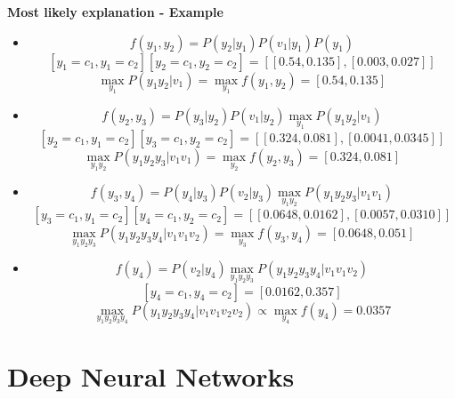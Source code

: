 \documentclass[parskip=half]{scrartcl}
\begin{document}
        \textbf{Most likely explanation - Example}
        \begin{itemize}
            \item 
            $$f(y_1, y_2) = P(y_2|y_1) P(v_1|y_1) P(y_1)$$
            $$[y_1 = c_1, y_1 = c_2] [y_2 = c_1, y_2 = c_2] = [[0.54, 0.135], [0.003, 0.027]] $$
            $$\max_{y_1} P(y_1y_2|v_1) = \max_{y_1} f(y_1, y_2) = [0.54, 0.135] $$
            \item 
            $$f(y_2, y_3) = P(y_3|y_2) P(v_1|y_2) \max_{y_1} P(y_1y_2|v_1)$$
            $$[y_2 = c_1, y_1 = c_2] [y_3 = c_1, y_2 = c_2] = [[0.324, 0.081], [0.0041, 0.0345]] $$
            $$\max_{y_1y_2} P(y_1y_2y_3|v_1v_1) = \max_{y_2} f(y_2, y_3) = [0.324, 0.081] $$
            \item 
            $$f(y_3, y_4) = P(y_4|y_3) P(v_2|y_3) \max_{y_1y_2} P(y_1y_2y_3|v_1v_1)$$
            $$[y_3 = c_1, y_1 = c_2] [y_4 = c_1, y_2 = c_2] = [[0.0648, 0.0162], [0.0057, 0.0310]] $$
            $$\max_{y_1y_2y_3} P(y_1y_2y_3y_4|v_1v_1v_2) = \max_{y_3} f(y_3, y_4) = [0.0648, 0.051] $$
            \item 
            $$f(y_4) = P(v_2|y_4) \max_{y_1y_2y_3} P(y_1y_2y_3y_4|v_1v_1v_2)$$
            $$[y_4 = c_1, y_4 = c_2] = [0.0162, 0.357] $$
            $$\max_{y_1y_2y_3y_4} P(y_1y_2y_3y_4|v_1v_1v_2v_2) \propto \max_{y_4} f(y_4) = 0.0357 $$
        \end{itemize}

    


\newpage


\section{Deep Neural Networks} %
\label{sec:deep_neural_networks}
\end{document}
